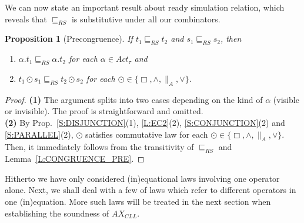 \documentclass{elsarticle}
\theoremstyle{plain}
\newtheorem{proposition}[theorem]{Proposition}
\theoremstyle{definition}
\begin{document}
We can now state an important result about ready simulation relation, which reveals that $\sqsubseteq_{RS}$ is substitutive under all our combinators.

\begin{proposition}[Precongruence]\label{L:CONGRUENCE}
  If $t_1 \sqsubseteq_{RS} t_2$ and $s_1 \sqsubseteq_{RS} s_2$, then
  \begin{enumerate}
    \item   $\alpha.t_1 \sqsubseteq_{RS} \alpha.t_2$ for each $\alpha \in Act_{\tau}$ and
    \item $t_1 \odot s_1 \sqsubseteq_{RS} t_2 \odot s_2$ for each $\odot \in \{\Box, \wedge, \parallel_A, \vee\}$.
  \end{enumerate}
\end{proposition}
\begin{proof}
\noindent \textbf{(1)} The argument splits into two cases depending on the kind of $\alpha$ (visible or invisible). The proof is straightforward and omitted.
\\

\noindent \textbf{(2)} By Prop.~\ref{S:DISJUNCTION}(1), \ref{L:EC2}(2), \ref{S:CONJUNCTION}(2)  and \ref{S:PARALLEL}(2), $\odot$ satisfies commutative law for each $\odot \in \{\Box,\wedge,\parallel_A, \vee\}$.
Then, it immediately follows from the transitivity of $\sqsubseteq_{RS}$ and Lemma~\ref{L:CONGRUENCE_PRE}.
\end{proof}

Hitherto we have only considered (in)equational laws involving one operator alone.
Next, we shall deal with a few of laws which refer to different operators in one (in)equation.
More such laws will be treated in the next section when establishing the soundness of $AX_{CLL}$.
\end{document}
